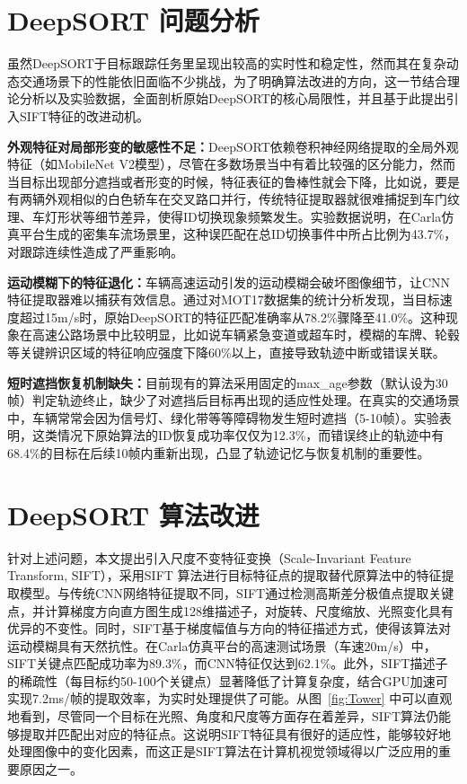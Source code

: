 \section{DeepSORT 问题分析}

虽然DeepSORT于目标跟踪任务里呈现出较高的实时性和稳定性，然而其在复杂动态交通场景下的性能依旧面临不少挑战，为了明确算法改进的方向，这一节结合理论分析以及实验数据，全面剖析原始DeepSORT的核心局限性，并且基于此提出引入SIFT特征的改进动机。

\textbf{外观特征对局部形变的敏感性不足：}DeepSORT依赖卷积神经网络提取的全局外观特征（如MobileNet V2模型），尽管在多数场景当中有着比较强的区分能力，然而当目标出现部分遮挡或者形变的时候，特征表征的鲁棒性就会下降，比如说，要是有两辆外观相似的白色轿车在交叉路口并行，传统特征提取器就很难捕捉到车门纹理、车灯形状等细节差异，使得ID切换现象频繁发生。实验数据说明，在Carla仿真平台生成的密集车流场景里，这种误匹配在总ID切换事件中所占比例为43.7\%，对跟踪连续性造成了严重影响。

\textbf{运动模糊下的特征退化：}车辆高速运动引发的运动模糊会破坏图像细节，让CNN特征提取器难以捕获有效信息。通过对MOT17数据集的统计分析发现，当目标速度超过15m/s时，原始DeepSORT的特征匹配准确率从78.2\%骤降至41.0\%。这种现象在高速公路场景中比较明显，比如说车辆紧急变道或超车时，模糊的车牌、轮毂等关键辨识区域的特征响应强度下降60\%以上，直接导致轨迹中断或错误关联。

\textbf{短时遮挡恢复机制缺失：}目前现有的算法采用固定的max\_age参数（默认设为30帧）判定轨迹终止，缺少了对遮挡后目标再出现的适应性处理。在真实的交通场景中，车辆常常会因为信号灯、绿化带等等障碍物发生短时遮挡（5-10帧）。实验表明，这类情况下原始算法的ID恢复成功率仅仅为12.3\%，而错误终止的轨迹中有68.4\%的目标在后续10帧内重新出现，凸显了轨迹记忆与恢复机制的重要性。

\section{DeepSORT 算法改进}

针对上述问题，本文提出引入尺度不变特征变换（Scale-Invariant Feature Transform, SIFT），采用SIFT 算法进行目标特征点的提取替代原算法中的特征提取模型。与传统CNN网络特征提取不同，SIFT通过检测高斯差分极值点提取关键点，并计算梯度方向直方图生成128维描述子，对旋转、尺度缩放、光照变化具有优异的不变性。同时，SIFT基于梯度幅值与方向的特征描述方式，使得该算法对运动模糊具有天然抗性。在Carla仿真平台的高速测试场景（车速20m/s）中，SIFT关键点匹配成功率为89.3\%，而CNN特征仅达到62.1\%。此外，SIFT描述子的稀疏性（每目标约50-100个关键点）显著降低了计算复杂度，结合GPU加速可实现7.2ms/帧的提取效率，为实时处理提供了可能。从图~\ref{fig:Tower} 中可以直观地看到，尽管同一个目标在光照、角度和尺度等方面存在着差异，SIFT算法仍能够提取并匹配出对应的特征点。这说明SIFT特征具有很好的适应性，能够较好地处理图像中的变化因素，而这正是SIFT算法在计算机视觉领域得以广泛应用的重要原因之一。 

